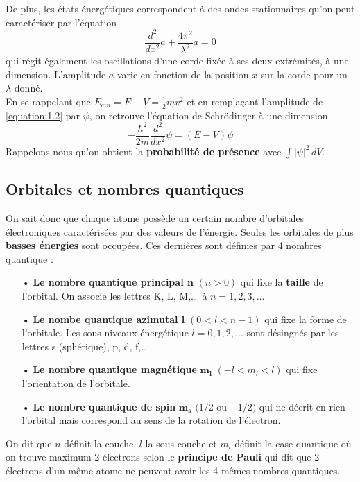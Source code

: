 \noindent De plus, les états énergétiques correspondent à des ondes stationnaires qu'on peut caractériser par l'équation 
\begin{equation}
	\frac{d^2}{dx^2}a + \frac{4\pi ^2}{\lambda ^2}a = 0
	\label{equation:1.2}
\end{equation}	 
qui régit également les oscillations d'une corde fixée à ses deux extrémités, à une dimension. L'amplitude $a$ varie en fonction de la position $x$ sur la corde pour un $\lambda$ donné. \\
En se rappelant que $E_{cin} = E-V = \frac{1}{2}mv^2$ et en remplaçant l'amplitude de \eqref{equation:1.2} par $\psi$, on retrouve l'équation de Schrödinger à une dimension 
\begin{equation}
	-\frac{\hbar ^2}{2m}\frac{d^2}{dx^2}\psi = (E-V)\psi
\end{equation}
Rappelons-nous qu'on obtient la \textbf{probabilité de présence} avec $\int |\psi| ^2 \, dV.$
	
\subsection{Orbitales et nombres quantiques}
\noindent On sait donc que chaque atome possède un certain nombre d'orbitales électroniques caractérisées par des valeurs de l'énergie. Seules les orbitales de plus \textbf{basses énergies} sont occupées. Ces dernières sont définies par 4 nombres quantique :\\
\begin{itemize}
	\item[•] \textbf{Le nombre quantique principal n} $(n>0)$ qui fixe la \textbf{taille} de l'orbital. On associe les lettres K, L, M,\dots \ à $n=1,2,3, \dots$
	\item[•] \textbf{Le nombe quantique azimutal l} $(0<l<n-1)$ qui fixe la forme de l'orbitale. Les sous-niveaux énergétique $l = 0,1,2, \dots$ sont désingnés par les lettres s (sphérique), p, d, f,\dots
	\item[•] \textbf{Le nombre quantique magnétique } $\mathbf{m_l}$ $(-l <m_l<l)$ qui fixe l'orientation de l'orbitale. 
	\item[•] \textbf{Le nombre quantique de spin} $\mathbf{ m_s}$ $(1/2$ ou $-1/2)$ qui ne décrit en rien l'orbital mais correspond au sens de la rotation de l'électron. \\
\end{itemize}
On dit que $n$ définit la couche, $l$ la sous-couche et $m_l$ définit la case quantique où on trouve maximum 2 électrons selon le \textbf{principe de Pauli} qui dit que 2 électrons d'un même atome ne peuvent avoir les 4 mêmes nombres quantiques. 
	
